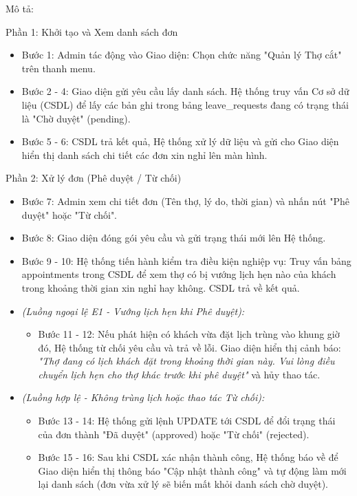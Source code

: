 \documentclass[../BTL.tex]{subfiles}
\begin{document}
Mô tả:

Phần 1: Khởi tạo và Xem danh sách đơn

\begin{itemize}
\item
  Bước 1: Admin tác động vào Giao diện: Chọn chức năng "Quản lý Thợ cắt"
  trên thanh menu.
\item
  Bước 2 - 4: Giao diện gửi yêu cầu lấy danh sách. Hệ thống truy vấn Cơ
  sở dữ liệu (CSDL) để lấy các bản ghi trong bảng leave\_requests đang
  có trạng thái là "Chờ duyệt" (pending).
\item
  Bước 5 - 6: CSDL trả kết quả, Hệ thống xử lý dữ liệu và gửi cho Giao
  diện hiển thị danh sách chi tiết các đơn xin nghỉ lên màn hình.
\end{itemize}

Phần 2: Xử lý đơn (Phê duyệt / Từ chối)

\begin{itemize}
\item
  Bước 7: Admin xem chi tiết đơn (Tên thợ, lý do, thời gian) và nhấn nút
  "Phê duyệt" hoặc "Từ chối".
\item
  Bước 8: Giao diện đóng gói yêu cầu và gửi trạng thái mới lên Hệ thống.
\item
  Bước 9 - 10: Hệ thống tiến hành kiểm tra điều kiện nghiệp vụ: Truy vấn
  bảng appointments trong CSDL để xem thợ có bị vướng lịch hẹn nào của
  khách trong khoảng thời gian xin nghỉ hay không. CSDL trả về kết quả.
\item
  \emph{(Luồng ngoại lệ E1 - Vướng lịch hẹn khi Phê duyệt):}

  \begin{itemize}
  \item
    Bước 11 - 12: Nếu phát hiện có khách vừa đặt lịch trùng vào khung
    giờ đó, Hệ thống từ chối yêu cầu và trả về lỗi. Giao diện hiển thị
    cảnh báo: \emph{"Thợ đang có lịch khách đặt trong khoảng thời gian
    này. Vui lòng điều chuyển lịch hẹn cho thợ khác trước khi phê
    duyệt"} và hủy thao tác.
  \end{itemize}
\item
  \emph{(Luồng hợp lệ - Không trùng lịch hoặc thao tác Từ chối):}

  \begin{itemize}
  \item
    Bước 13 - 14: Hệ thống gửi lệnh UPDATE tới CSDL để đổi trạng thái
    của đơn thành "Đã duyệt" (approved) hoặc "Từ chối" (rejected).
  \item
    Bước 15 - 16: Sau khi CSDL xác nhận thành công, Hệ thống báo về để
    Giao diện hiển thị thông báo "Cập nhật thành công" và tự động làm
    mới lại danh sách (đơn vừa xử lý sẽ biến mất khỏi danh sách chờ
    duyệt).
  \end{itemize}
\end{itemize}
\end{document}
